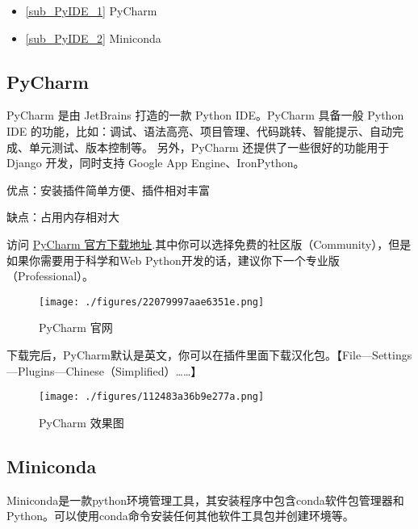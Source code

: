 
\begin{issues}
\issueTODO
\end{issues}


\begin{itemize}
\item \autoref{sub_PyIDE_1} PyCharm 
\item \autoref{sub_PyIDE_2} Miniconda
\end{itemize} 

\subsection{PyCharm}\label{sub_PyIDE_1}

PyCharm 是由 JetBrains 打造的一款 Python IDE。PyCharm 具备一般 Python IDE 的功能，比如：调试、语法高亮、项目管理、代码跳转、智能提示、自动完成、单元测试、版本控制等。 另外，PyCharm 还提供了一些很好的功能用于 Django 开发，同时支持 Google App Engine、IronPython。

优点：安装插件简单方便、插件相对丰富

缺点：占用内存相对大

访问 \href{http://www.jetbrains.com/pycharm/download/}{PyCharm 官方下载地址}.其中你可以选择免费的社区版（Community），但是如果你需要用于科学和Web Python开发的话，建议你下一个专业版（Professional）。

\begin{figure}[ht]
\centering
\texttt{[image: ./figures/22079997aae6351e.png]}
\caption{PyCharm 官网} \label{fig_PyIDE_1}
\end{figure}

下载完后，PyCharm默认是英文，你可以在插件里面下载汉化包。【File—Settings—Plugins—Chinese（Simplified）……】

\begin{figure}[ht]
\centering
\texttt{[image: ./figures/112483a36b9e277a.png]}
\caption{PyCharm 效果图} \label{fig_PyIDE_2}
\end{figure}

\subsection{Miniconda}\label{sub_PyIDE_2}

Miniconda是一款python环境管理工具，其安装程序中包含conda软件包管理器和Python。可以使用conda命令安装任何其他软件工具包并创建环境等。

